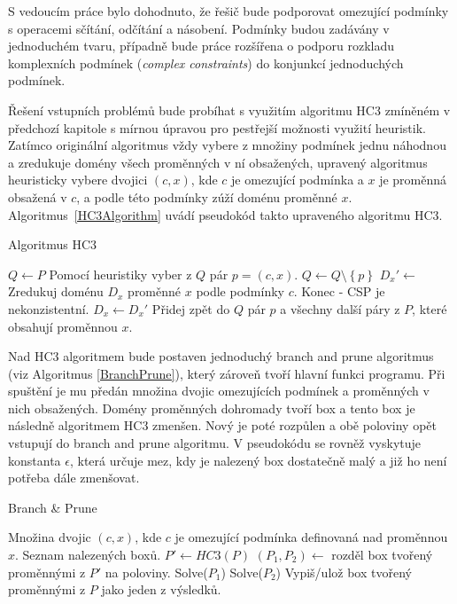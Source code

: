 S vedoucím práce bylo dohodnuto, že řešič bude podporovat omezující podmínky s operacemi sčítání, odčítání a násobení. Podmínky budou zadávány v jednoduchém tvaru, případně bude práce rozšířena o podporu rozkladu komplexních podmínek (\emph{complex constraints}) do konjunkcí jednoduchých podmínek. 

Řešení vstupních problémů bude probíhat s využitím algoritmu HC3 zmíněném v předchozí kapitole s mírnou úpravou pro pestřejší možnosti využití heuristik. Zatímco originální algoritmus vždy vybere z množiny podmínek jednu náhodnou a zredukuje domény všech proměnných v ní obsažených, upravený algoritmus heuristicky vybere dvojici $(c, x)$, kde $c$ je omezující podmínka a $x$ je proměnná obsažená v $c$, a podle této podmínky zúží doménu proměnné $x$. Algoritmus~\ref{HC3Algorithm} uvádí pseudokód takto upraveného algoritmu HC3.

\begin{algorithm}
\caption{Algoritmus HC3}
\label{HC3Algorithm}
\begin{algorithmic}[1]
\State $Q \gets P$
\State Pomocí heuristiky vyber z $Q$ pár $p = (c, x)$.
\State $Q \gets Q \setminus \left\{ p \right\}$
\State $D_x' \gets$ Zredukuj doménu $D_x$ proměnné $x$ podle podmínky $c$.
\State Konec - CSP je nekonzistentní.
\EndIf
{}
\State $D_x \gets D_x'$
\State Přidej zpět do $Q$ pár $p$ a všechny další páry z $P$, které obsahují proměnnou $x$.
\EndIf
\EndWhile
\EndProcedure
\end{algorithmic}
\end{algorithm}

Nad HC3 algoritmem bude postaven jednoduchý branch and prune algoritmus (viz Algoritmus \ref{BranchPrune}), který zároveň tvoří hlavní funkci programu. Při spuštění je mu předán množina dvojic omezujících podmínek a proměnných v nich obsažených. Domény proměnných dohromady tvoří box a tento box je následně algoritmem HC3 zmenšen. Nový je poté rozpůlen a obě poloviny opět vstupují do branch and prune algoritmu. V pseudokódu se rovněž vyskytuje konstanta $\epsilon$, která určuje mez, kdy je nalezený box dostatečně malý a již ho není potřeba dále zmenšovat.

\begin{algorithm}
\caption{Branch \& Prune}
\label{BranchPrune}
\begin{algorithmic}[1]
\Require Množina dvojic $(c, x)$, kde $c$ je omezující podmínka definovaná nad proměnnou $x$.
\Ensure Seznam nalezených boxů.
\State $P' \gets HC3(P)$
\State $(P_1, P_2) \gets $ rozděl box tvořený proměnnými z $P'$ na poloviny.
\State Solve($P_1$)
\State Solve($P_2$)
\Else
\State Vypiš/ulož box tvořený proměnnými z $P$ jako jeden z výsledků.
\EndIf
\EndProcedure
\end{algorithmic}
\end{algorithm}

